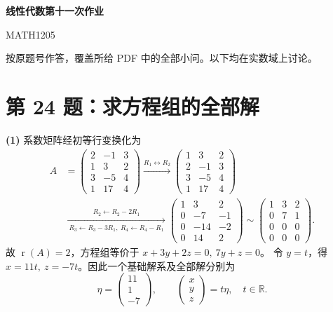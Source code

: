 \documentclass[11pt,a4paper,fontset=fandol]{ctexart}
\newcommand{\problem}[1]{\Needspace{6\baselineskip}\section*{#1}}
\newcommand{\ans}[1]{\boxed{#1}}
\newcommand{\rank}{\operatorname{r}}
\newcommand{\R}{\mathbb R}
\begin{document}
\setlength{\abovedisplayskip}{6pt plus 2pt minus 2pt}
\setlength{\belowdisplayskip}{6pt plus 2pt minus 2pt}
\setlength{\abovedisplayshortskip}{4pt plus 1pt minus 1pt}
\setlength{\belowdisplayshortskip}{4pt plus 1pt minus 1pt}
\begin{center}
{\LARGE\bfseries 线性代数第十一次作业}\par
\vspace{0.25em}
{\small MATH1205}
\end{center}
\vspace{-0.3em}
按原题号作答，覆盖所给 PDF 中的全部小问。以下均在实数域上讨论。

\problem{第 24 题：求方程组的全部解}
\textbf{(1)} 系数矩阵经初等行变换化为
\[
\begin{aligned}
A&=\begin{pmatrix}2&-1&3\\1&3&2\\3&-5&4\\1&17&4\end{pmatrix}
\xrightarrow{R_1\leftrightarrow R_2}
\begin{pmatrix}1&3&2\\2&-1&3\\3&-5&4\\1&17&4\end{pmatrix}\\[2pt]
&\xrightarrow[\ R_3\leftarrow R_3-3R_1,\ R_4\leftarrow R_4-R_1\ ]{R_2\leftarrow R_2-2R_1}
\begin{pmatrix}1&3&2\\0&-7&-1\\0&-14&-2\\0&14&2\end{pmatrix}
\sim\begin{pmatrix}1&3&2\\0&7&1\\0&0&0\\0&0&0\end{pmatrix}.
\end{aligned}
\]
故 $\rank(A)=2$，方程组等价于 $x+3y+2z=0,\ 7y+z=0$。
令 $y=t$，得 $x=11t,\ z=-7t$。因此一个基础解系及全部解分别为
\[
\ans{\eta=\begin{pmatrix}11\\1\\-7\end{pmatrix},\qquad
\begin{pmatrix}x\\y\\z\end{pmatrix}=t\eta,\quad t\in\R.}
\]
\end{document}
